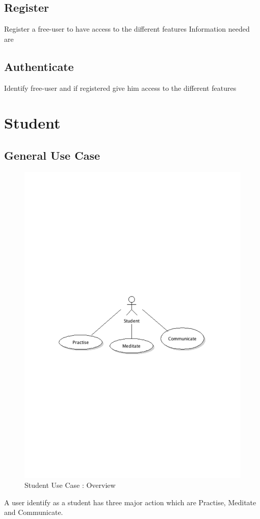 	\subsection{Register}Register a free-user to have access to the different features
		Information needed are 
	\subsection{Authenticate}Identify free-user and if registered give him access to the different features
\newpage
\section{Student}
	\subsection{General Use Case}
		\begin{figure}[ht]
			\begin{center}
				\includegraphics[width=\textwidth,  trim=2cm 10cm 2cm 11cm]{UML_figure/UC/student/UC_Student_General.pdf}
				\caption{Student Use Case : Overview}
			\end{center}
		\end{figure}
		A user identify as a student has three major action which are Practise, Meditate and Communicate.
